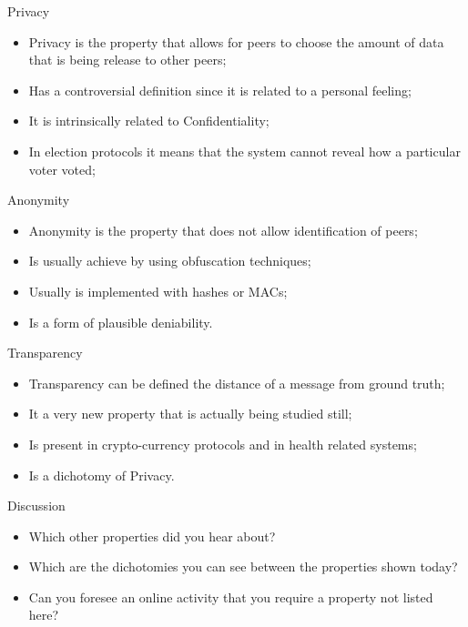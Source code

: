 \documentclass[12pt,table,xcolor={dvipsnames}]{beamer}
\begin{document}
\begin{frame}{Privacy}
\begin{itemize}
\item Privacy is the property that allows for peers to choose the amount of data that is being release to other peers;\pause
\item Has a controversial definition since it is related to a personal feeling;\pause
\item It is intrinsically related to Confidentiality;\pause
\item In election protocols it means that the system cannot reveal how a particular voter voted;\pause
\end{itemize}
\end{frame}

\begin{frame}{Anonymity}
\begin{itemize}
\item Anonymity is the property that does not allow identification of peers;\pause
\item Is usually achieve by using obfuscation techniques;\pause
\item Usually is implemented with hashes or MACs;\pause
\item Is a form of plausible deniability.
\end{itemize}
\end{frame}

\begin{frame}{Transparency}
\begin{itemize}
\item Transparency can be defined the distance of a message from ground truth;\pause
\item It a very new property that is actually being studied still;\pause
\item Is present in crypto-currency protocols and in health related systems;\pause
\item Is a dichotomy of Privacy.
\end{itemize}
\end{frame}

\begin{frame}{Discussion}
\begin{itemize}
\item Which other properties did you hear about?\pause
\item Which are the dichotomies you can see between the properties shown today?\pause
\item Can you foresee an online activity that you require a property not listed here?
\end{itemize}
\end{frame}
\end{document}

